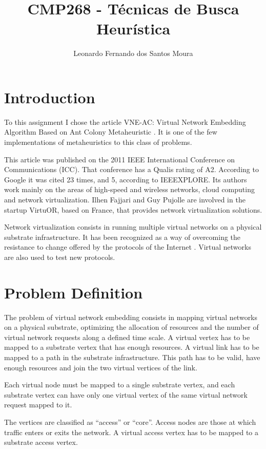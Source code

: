 \documentclass[10pt, a4paper, twocolumn]{article}
\title{CMP268 - T\'{e}cnicas de Busca Heur\'{i}stica}
\author{Leonardo Fernando dos Santos Moura}
\begin{document}
\maketitle

\section{Introduction} 
To this assignment I chose the article VNE-AC: Virtual Network Embedding Algorithm Based on Ant Colony Metaheuristic \cite{fajjari2011}. It is one of the few implementations of metaheuristics to this class of problems.

This article was published on the 2011 IEEE International Conference on Communications (ICC). That conference has a Qualis rating of A2. According to Google it was cited 23 times, and 5, according to IEEEXPLORE.
Its authors work mainly on the areas of high-speed and wireless networks, cloud computing and network virtualization. Ilhen Fajjari and Guy Pujolle are involved in the startup VirtuOR, based on France, that provides network virtualization solutions.

Network virtualization consists in running multiple virtual networks on a physical substrate infrastructure. It has been recognized as a way of overcoming the resistance to change offered by the protocols of the Internet \cite{lu}. Virtual networks are also used to test new protocols.

\section{Problem Definition}
The problem of virtual network embedding consists in mapping virtual networks on a physical substrate, optimizing the allocation of resources and the number of virtual network requests along a defined time scale. A virtual vertex has to be mapped to a substrate vertex that has enough resources. A virtual link has to be mapped to a path in the substrate infrastructure. This path has to be valid, have enough resources and join the two virtual vertices of the link.

Each virtual node must be mapped to a single substrate vertex, and each substrate vertex can have only one virtual vertex of the same virtual network request mapped to it.

The vertices are classified as ``access'' or ``core''. Access nodes are those at which traffic enters or exits the network. A virtual access vertex has to be mapped to a substrate access vertex. 
\end{document}
